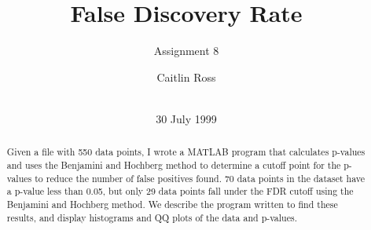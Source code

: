 \documentclass{acm_proc_article-sp}
\begin{document}
\title{False Discovery Rate}
\subtitle{Assignment 8}
%
%
%
%
%

%
\author{
	\alignauthor Caitlin Ross\\
	 \\
}

\date{30 July 1999}

\maketitle

\begin{abstract}
Given a file with 550 data points, I wrote a MATLAB program that calculates p-values and uses the Benjamini and Hochberg method to determine a cutoff point for the p-values to reduce the number of false positives found.  70 data points in the dataset have a p-value less than 0.05, but only 29 data points fall under the FDR cutoff using the Benjamini and Hochberg method.  We describe the program written to find these results, and display histograms and QQ plots of the data and p-values.
\end{abstract}
\end{document}
